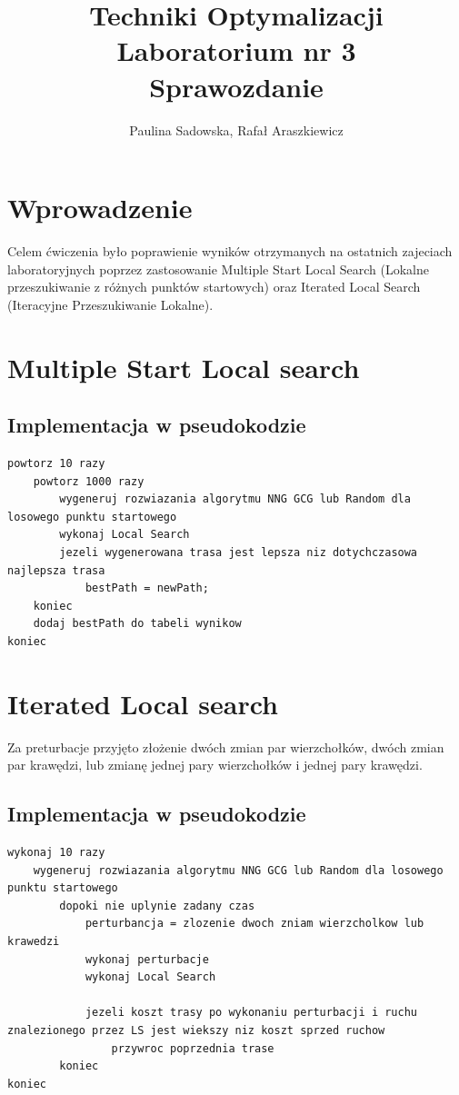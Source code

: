 \documentclass[a4paper 10pt]{article}
\title{\textbf{Techniki Optymalizacji} \\
Laboratorium nr 3 \\
Sprawozdanie}
\author{Paulina Sadowska, Rafał Araszkiewicz}
\begin{document}
\maketitle

\section{Wprowadzenie}
Celem ćwiczenia było poprawienie wyników otrzymanych na ostatnich zajeciach  laboratoryjnych poprzez zastosowanie Multiple Start Local Search (Lokalne przeszukiwanie z różnych punktów startowych) oraz Iterated Local Search (Iteracyjne Przeszukiwanie Lokalne).
\section{Multiple Start Local search}
\label{Multiple Start Local search}
\subsection{Implementacja w pseudokodzie}
\begin{lstlisting}[frame=single]
powtorz 10 razy
	powtorz 1000 razy
		wygeneruj rozwiazania algorytmu NNG GCG lub Random dla losowego punktu startowego
		wykonaj Local Search
		jezeli wygenerowana trasa jest lepsza niz dotychczasowa najlepsza trasa
			bestPath = newPath;
	koniec
	dodaj bestPath do tabeli wynikow
koniec

\end{lstlisting}

\section{Iterated Local search}
\label{Iterated Local search}
Za preturbacje przyjęto złożenie dwóch zmian par wierzchołków, dwóch zmian par krawędzi, lub zmianę jednej pary wierzchołków i jednej pary krawędzi.
\subsection{Implementacja w pseudokodzie}
\begin{lstlisting}[frame=single]
wykonaj 10 razy
	wygeneruj rozwiazania algorytmu NNG GCG lub Random dla losowego punktu startowego
		dopoki nie uplynie zadany czas
			perturbancja = zlozenie dwoch zniam wierzcholkow lub krawedzi
			wykonaj perturbacje
			wykonaj Local Search
			
			jezeli koszt trasy po wykonaniu perturbacji i ruchu znalezionego przez LS jest wiekszy niz koszt sprzed ruchow
				przywroc poprzednia trase
		koniec
koniec
\end{lstlisting}
\end{document}
